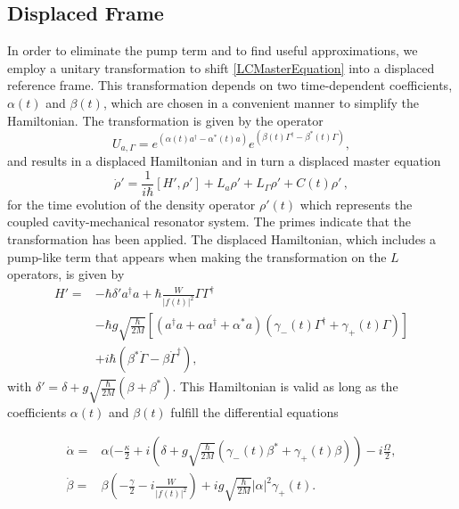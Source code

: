 \documentclass[reprint, amsmath,amssymb, aps,pra]{revtex4-1}
\begin{document}
\subsection{Displaced Frame}

In order to eliminate the pump term and to find useful
  approximations, we employ a unitary transformation to
shift \eqref{LCMasterEquation} into a displaced reference frame. This
transformation depends on two time-dependent coefficients, $\alpha(t)$
and $\beta(t)$, which are chosen in a convenient manner to simplify
the Hamiltonian. The transformation is given by the operator
\begin{equation}\label{ShiftTransform}
U_{a,\Gamma} = e^{(\alpha(t) a^\dagger - \alpha^*(t)a)}e^{(\beta(t) \Gamma^\dagger - \beta^*(t)\Gamma)},
\end{equation}
and results in a displaced Hamiltonian and in turn a displaced master
equation
\begin{equation}
\dot{\rho}' = \frac{1}{i\hbar}[H',\rho'] +L_a\rho' + L_\Gamma \rho' + C(t)\rho'\, ,
\end{equation}
for the time evolution of the density operator $\rho'(t)$ which
represents the coupled cavity-mechanical resonator system. The primes
indicate that the transformation has been applied. The displaced
Hamiltonian, which includes a pump-like term that appears when making the
transformation on the $L$ operators, is given by
\begin{align*}
  H'=& -\hbar \delta' a^\dagger a + \hbar\frac{W}{|f(t)|^2}\Gamma \Gamma^\dagger\\
     &-\hbar g\sqrt{\frac{\hbar}{2M}}[(a^{\dagger}a +\alpha a^{\dagger}+\alpha^* a)(\gamma_-(t)\Gamma^{\dagger}+\gamma_+(t)\Gamma)]\\
     &+ i\hbar(\beta^*\dot{\Gamma} - \beta \dot{\Gamma}^\dagger),
\end{align*}
with $\delta' = \delta + g\sqrt{\frac{\hbar}{2M}}(\beta + \beta^*)$.
This Hamiltonian is valid as long as the coefficients $\alpha(t)$ and
$\beta(t)$ fulfill the differential equations

\begin{align}
\dot{\alpha} =& \alpha(-\frac{\kappa}{2}+i(\delta+g\sqrt{\frac{\hbar}{2M}}(\gamma_-(t) \beta^* + \gamma_+(t) \beta))-i\frac{\Omega}{2},\\
\dot{\beta} =& \beta(-\frac{\gamma}{2}-i\frac{W}{|f(t)|^2})+ig\sqrt{\frac{\hbar}{2M}}|\alpha|^2\gamma_+(t).
\end{align}
\end{document}
